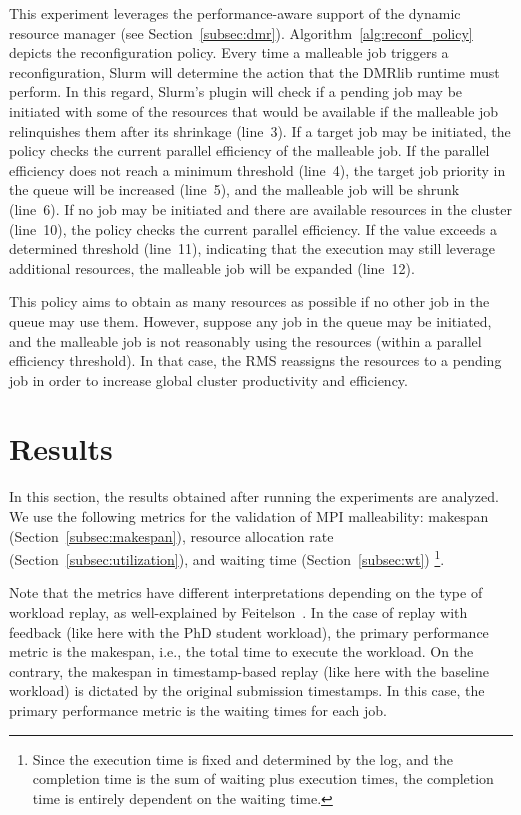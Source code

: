 \documentclass[a4paper,fleqn]{cas-dc}
\begin{document}
\begin{enumerate}[wide]
    This experiment leverages the performance-aware support of the dynamic resource manager (see Section~\ref{subsec:dmr}). 
    Algorithm~\ref{alg:reconf_policy} depicts the reconfiguration policy.
    Every time a malleable job triggers a reconfiguration, Slurm will determine the action that the DMRlib runtime must perform.
    In this regard, Slurm's plugin will check if a pending job may be initiated with some of the resources that would be available if the malleable job relinquishes them after its shrinkage (line~3).
    If a target job may be initiated, the policy checks the current parallel efficiency of the malleable job.
    If the parallel efficiency does not reach a minimum threshold (line~4), the target job priority in the queue will be increased (line~5), and the malleable job will be shrunk (line~6).
    If no job may be initiated and there are available resources in the cluster (line~10), the policy checks the current parallel efficiency. If the value exceeds a determined threshold (line~11), indicating that the execution may still leverage additional resources, the malleable job will be expanded (line~12).

    This policy aims to obtain as many resources as possible if no other job in the queue may use them. However, suppose any job in the queue may be initiated, and the malleable job is not reasonably using the resources (within a parallel efficiency threshold). In that case, the RMS reassigns the resources to a pending job in order to increase global cluster productivity and efficiency.
\end{enumerate}

\section{Results}
\label{sec:results}
In this section, the results obtained after running the experiments are analyzed.
We use the following metrics for the validation of MPI malleability: makespan (Section~\ref{subsec:makespan}), resource allocation rate (Section~\ref{subsec:utilization}), and waiting time (Section~\ref{subsec:wt})%
\footnote{
Since the execution time is fixed and determined by the log, and the completion time is the sum of waiting plus execution times, the completion time is entirely dependent on the waiting time.
}.

Note that the metrics have different interpretations depending on the type of workload replay, as well-explained by Feitelson~\cite{feitelson_resampling_2021}.
In the case of replay with feedback (like here with the PhD student workload), the primary performance metric is the makespan, i.e., the total time to execute the workload.
On the contrary, the makespan in timestamp-based replay (like here with the baseline workload) is dictated by the original submission timestamps.
In this case, the primary performance metric is the waiting times for each job.
\end{document}
